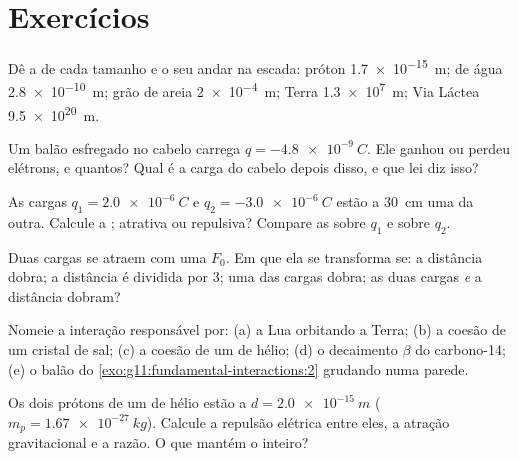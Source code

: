 \section{Exercícios}

\begin{exercise}[$\star$]\label{exo:g11:fundamental-interactions:1}
Dê a  de cada tamanho e o seu andar na escada: próton
\qty{1.7e-15}{m};  de água \qty{2.8e-10}{m}; grão de areia
\qty{2e-4}{m}; Terra \qty{1.3e7}{m}; Via Láctea \qty{9.5e20}{m}.
\end{exercise}

\begin{exercise}[$\star$]\label{exo:g11:fundamental-interactions:2}
Um balão esfregado no cabelo carrega $q = \qty{-4.8e-9}{C}$. Ele ganhou
ou perdeu elétrons, e quantos? Qual é a carga do cabelo depois disso, e
que lei diz isso?
\end{exercise}

\begin{exercise}[$\star$]\label{exo:g11:fundamental-interactions:3}
As cargas $q_1 = \qty{+2.0e-6}{C}$ e $q_2 = \qty{-3.0e-6}{C}$ estão a
\qty{30}{cm} uma da outra. Calcule a ; atrativa ou repulsiva?
Compare as  sobre $q_1$ e sobre $q_2$.
\end{exercise}

\begin{exercise}[$\star$]\label{exo:g11:fundamental-interactions:4}
Duas cargas se atraem com uma  $F_0$. Em que ela se transforma se: a
distância dobra; a distância é dividida por $3$; uma das cargas dobra; as
duas cargas \emph{e} a distância dobram?
\end{exercise}

\begin{exercise}[$\star$]\label{exo:g11:fundamental-interactions:5}
Nomeie a interação responsável por: (a) a Lua orbitando a Terra; (b) a
coesão de um cristal de sal; (c) a coesão de um  de hélio; (d) o
decaimento $\beta$ do carbono-14; (e) o balão do
\cref{exo:g11:fundamental-interactions:2} grudando numa parede.
\end{exercise}

\begin{exercise}[$\star\star$]\label{exo:g11:fundamental-interactions:6}
Os dois prótons de um  de hélio estão a $d = \qty{2.0e-15}{m}$
($m_p = \qty{1.67e-27}{kg}$). Calcule a repulsão elétrica entre eles, a
atração gravitacional e a razão. O que mantém o  inteiro?
\end{exercise}

